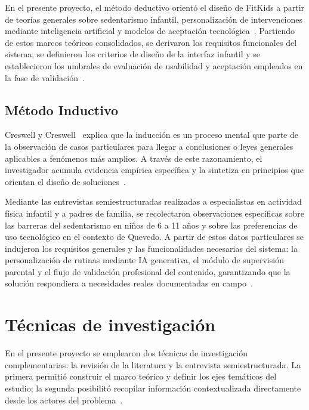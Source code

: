 				En el presente proyecto, el método deductivo orientó el diseño de FitKids a partir de teorías generales sobre sedentarismo infantil, personalización de intervenciones mediante inteligencia artificial y modelos de aceptación tecnológica~\cite{Davis1989,WangGamif2025}. Partiendo de estos marcos teóricos consolidados, se derivaron los requisitos funcionales del sistema, se definieron los criterios de diseño de la interfaz infantil y se establecieron los umbrales de evaluación de usabilidad y aceptación empleados en la fase de validación~\cite{HernandezSampieri2014,Bull2020}.
				
			\subsection{Método Inductivo}
				Creswell y Creswell~\cite{Creswell2018} explica que la inducción es un proceso mental que parte de la observación de casos particulares para llegar a conclusiones o leyes generales aplicables a fenómenos más amplios. A través de este razonamiento, el investigador acumula evidencia empírica específica y la sintetiza en principios que orientan el diseño de soluciones~\cite{Creswell2018}.
				
				Mediante las entrevistas semiestructuradas realizadas a especialistas en actividad física infantil y a padres de familia, se recolectaron observaciones específicas sobre las barreras del sedentarismo en niños de 6 a 11 años y sobre las preferencias de uso tecnológico en el contexto de Quevedo. A partir de estos datos particulares se indujeron los requisitos generales y las funcionalidades necesarias del sistema: la personalización de rutinas mediante IA generativa, el módulo de supervisión parental y el flujo de validación profesional del contenido, garantizando que la solución respondiera a necesidades reales documentadas en campo~\cite{Creswell2018,Direito2017}.
		
		
		\section{Técnicas de investigación}
			En el presente proyecto se emplearon dos técnicas de investigación complementarias: la revisión de la literatura y la entrevista semiestructurada. La primera permitió construir el marco teórico y definir los ejes temáticos del estudio; la segunda posibilitó recopilar información contextualizada directamente desde los actores del problema~\cite{HernandezSampieri2014,Creswell2018}.
			
